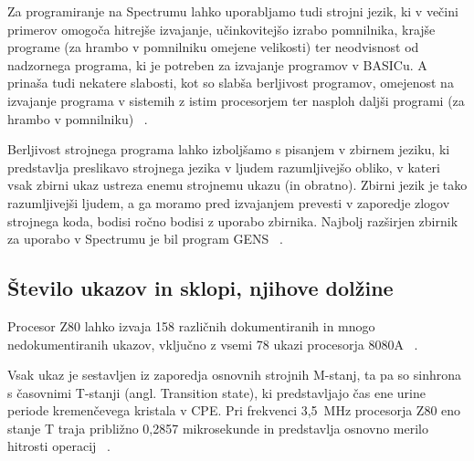 \documentclass[a4paper, 12pt, openright]{book}
\begin{document}
    Za programiranje na Spectrumu lahko uporabljamo tudi strojni jezik, ki v večini
    primerov omogoča hitrejše izvajanje, učinkovitejšo izrabo pomnilnika, krajše programe
    (za hrambo v pomnilniku omejene velikosti) ter neodvisnost od nadzornega programa,
    ki je potreben za izvajanje programov v BASICu. A prinaša tudi nekatere slabosti,
    kot so slabša berljivost programov, omejenost na izvajanje programa v sistemih
    z istim procesorjem ter nasploh daljši programi (za hrambo v pomnilniku) ~\cite{strojnijezikzaprocesorz80}.

    Berljivost strojnega programa lahko izboljšamo s pisanjem v zbirnem jeziku, ki
    predstavlja preslikavo strojnega jezika v ljudem razumljivejšo obliko, v
    kateri vsak zbirni ukaz ustreza enemu strojnemu ukazu (in obratno). Zbirni jezik
    je tako razumljivejši ljudem, a ga moramo pred izvajanjem prevesti v
    zaporedje zlogov strojnega koda, bodisi ročno bodisi z uporabo zbirnika.
    Najbolj razširjen zbirnik za uporabo v Spectrumu je bil program GENS ~\cite{strojnijezikzaprocesorz80,
    zxspectrumbasicprogramming}.

    \subsection{Število ukazov in sklopi, njihove dolžine}

    Procesor Z80 lahko izvaja 158 različnih dokumentiranih in mnogo
    nedokumentiranih ukazov, vključno z vsemi 78 ukazi procesorja 8080A ~\cite{z80cpuusermanual}.

    Vsak ukaz je sestavljen iz zaporedja osnovnih strojnih M-stanj, ta pa so sinhrona
    s časovnimi T-stanji (angl. Transition state), ki predstavljajo čas ene urine
    periode kremenčevega kristala v CPE. Pri frekvenci 3,5~MHz procesorja Z80
    eno stanje T traja približno 0,2857 mikrosekunde in predstavlja osnovno
    merilo hitrosti operacij ~\cite{strojnijezikzaprocesorz80}.
\end{document}
